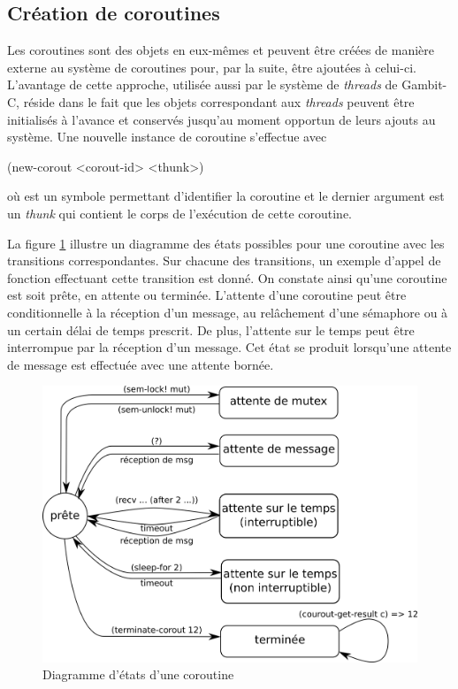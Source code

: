 \documentclass[12pt,twoside,letterpaper,francais]{book}
\newcommand{\scheme}[1]{\selectlanguage{english}{\tt #1}\selectlanguage{french}}
\begin{document}
\FloatBarrier
\subsection{Création de coroutines}
Les coroutines sont des objets en eux-mêmes et peuvent être créées de
manière externe au système de coroutines pour, par la suite, être
ajoutées à celui-ci. L'avantage de cette approche, utilisée aussi par
le système de \textit{threads} de Gambit-C, réside dans le fait que
les objets correspondant aux \textit{threads} peuvent être initialisés
à l'avance et conservés jusqu'au moment opportun de leurs ajouts au
système. Une nouvelle instance de coroutine s'effectue avec

\begin{schemecode}
(new-corout <corout-id> <thunk>)
\end{schemecode}

\noindent
où \scheme{<corout-id>} est un symbole permettant d'identifier la
coroutine et le dernier argument est un \textit{thunk} qui contient le
corps de l'exécution de cette coroutine.

La figure \ref{Corout:state-diag} illustre un diagramme des états
possibles pour une coroutine avec les transitions correspondantes. Sur
chacune des transitions, un exemple d'appel de fonction effectuant
cette transition est donné. On constate ainsi qu'une coroutine est
soit prête, en attente ou terminée. L'attente d'une coroutine peut
être conditionnelle à la réception d'un message, au relâchement d'une
sémaphore ou à un certain délai de temps prescrit. De plus, l'attente
sur le temps peut être interrompue par la réception d'un message. Cet
état se produit lorsqu'une attente de message est effectuée avec une
attente bornée.\\

\begin{figure}[htb!]
  \center
  \includegraphics[scale=0.7]{corout-state-diag}
  \caption{Diagramme d'états d'une coroutine}
  \label{Corout:state-diag}
\end{figure}
\end{document}
